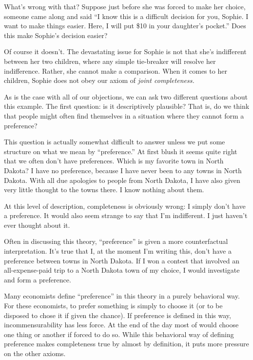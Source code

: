 What's wrong with that?  Suppose just before she was forced to make her choice, someone came along and said ``I know this is a difficult decision for you, Sophie.  I want to make things easier.  Here, I will put \$10 in your daughter's pocket.'' Does this make Sophie's decision easier?

Of course it doesn't.  The devastating issue for Sophie is not that she's indifferent between her two children, where any simple tie-breaker will resolve her indifference.  Rather, she cannot make a comparison.  When it comes to her children, Sophie does not obey our axiom of {\it joint completeness.}

As is the case with all of our objections, we can ask two different questions about this example.  The first question: is it descriptively plausible?  That is, do we think that people might often find themselves in a situation where they cannot form a preference?

This question is actually somewhat difficult to answer unless we put some structure on what we mean by ``preference.''  At first blush it seems quite right that we often don't have preferences.  Which is my favorite town in North Dakota? I have no preference, because I have never been to any towns in North Dakota. With all due apologies to people from North Dakota, I have also given very little thought to the towns there. I know nothing about them.

At this level of description, completeness is obviously wrong: I simply don't have a preference.  It would also seem strange to say that I'm indifferent.  I just haven't ever thought about it.

Often in discussing this theory, ``preference'' is given a more counterfactual interpretation.  It's true that I, at the moment I'm writing this, don't have a preference between towns in North Dakota.  If I won a contest that involved an all-expense-paid trip to a North Dakota town of my choice, I would investigate and form a preference.  

Many economists define ``preference'' in this theory in a purely behavioral way.  For these economists, to prefer something is simply to choose it (or to be disposed to chose it if given the chance).  If preference is defined in this way, incommensurability has less force.  At the end of the day most of would choose one thing or another if forced to do so.  While this behavioral way of defining preference makes completeness true by almost by definition, it puts more pressure on the other axioms.

